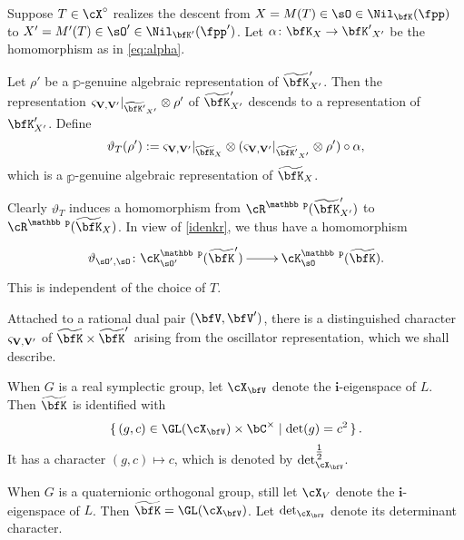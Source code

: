 \documentclass[12pt,a4paper]{amsart}
\newcommand{\wt}{\widetilde}
\numberwithin{equation}{section}
\theoremstyle{remark}
\def\wtbfK{\widetilde{\bfK}}
\def\half{{\tfrac{1}{2}}}
\def\MMP{M}
\def\Xo{\cX^\circ}
\def\dliftv{\vartheta}
\def\mktvvp{\varsigma_{{\bf V},{\bf V}'}}
\begin{document}
  Suppose $T\in \Xo$ realizes the descent from  $X = \MMP(T)\in \sO\in \Nil_{\bfK}(\fpp)$
  to
  $X' = \MMP'(T)\in \sO'\in \Nil_{\bfK'}(\fpp')$. Let  $\alpha\colon
  {\bfK}_X\rightarrow {\bfK'}_{X'}$ be the homomorphism as in \cref{eq:alpha}.

  Let $\rho'$ be a $\mathbb p$-genuine algebraic representation  of $\wtbfK'_{X'}$. Then  the representation $\mktvvp|_{\wt{\bfK'}_{X'}}\otimes \rho'$ of $\wtbfK'_{X'}$ descends  to a representation of $\bfK'_{X'}$.  Define
  \begin{equation}\label{defn:tlift.rho}
    \dliftv_{T}(\rho'):= \mktvvp|_{\wt{\bfK}_{X}} \otimes (\mktvvp|_{\wt{\bfK'}_{X'}}\otimes \rho')\circ \alpha,
  \end{equation}
  which  is a $\mathbb p$-genuine algebraic representation of $\wt{\bfK}_{X}$.

  Clearly $\dliftv_T$ induces a homomorphism from
  $\cR^{\mathbb p}(\wtbfK'_{X'})$ to $\cR^{\mathbb p}(\wtbfK_X)$.
  In view of \eqref{idenkr}, we thus have a homomorphism
  \begin{equation}\label{defn:DS.ch}
    \xymatrix{
      \dliftv_{\sO',\sO}\colon \cK^{\mathbb p}_{\sO'}(\wt{\bfK}') \ar[r]&
      \cK^{\mathbb p}_{\sO}(\wt{\bfK}).
    }
  \end{equation}
  This is independent of the choice of $T$.



 Attached to a rational dual pair $(\bfV,\bfV')$, there is a distinguished character
  $\mktvvp$ of
  $\wtbfK\times\wtbfK'$ arising from the oscillator
  representation, which we shall describe.

  When $G$ is a real symplectic group, let $\cX_{\bfV}$ denote the $\mathbf i$-eigenspace of
  $L$. Then $\wtbfK$ is identified with \[
    \set{(g,c)\in \GL(\cX_{\bfV})\times
      \bC^\times|\det(g) = c^2}.\]
  It has a %
  character
  $ (g,c)\mapsto c$, which is denoted by $\det_{\cX_{\bfV}}^{\half}$. %


  When $G$ is a quaternionic orthogonal group, still let
  $\cX_V$ denote the $\mathbf i$-eigenspace of $L$. Then $\wtbfK = \GL(\cX_{\bfV})$. Let $\det_{\cX_{\bfV}}$ denote its determinant character.
\end{document}
